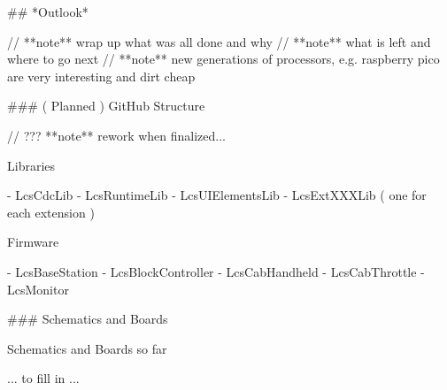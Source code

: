 ## *Outlook*

// **note** wrap up what was all done and why
// **note** what is left and where to go next
// **note** new generations of processors, e.g. raspberry pico are very interesting and dirt cheap


### ( Planned ) GitHub Structure

// ??? **note** rework when finalized... 

Libraries

- LcsCdcLib
- LcsRuntimeLib
- LcsUIElementsLib
- LcsExtXXXLib ( one for each extension )

Firmware

- LcsBaseStation
- LcsBlockController
- LcsCabHandheld
- LcsCabThrottle
- LcsMonitor

### Schematics and Boards

Schematics and Boards so far

... to fill in ...
